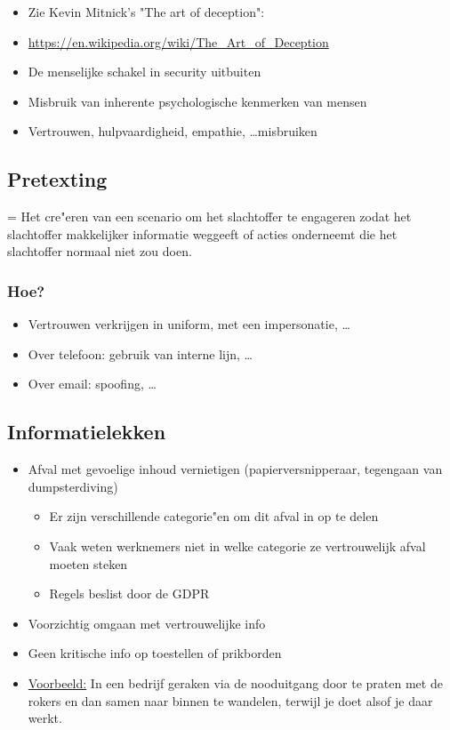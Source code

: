 \documentclass{article}
\begin{document}
\begin{itemize}
    \item Zie Kevin Mitnick's "The art of deception":
    \item \url{https://en.wikipedia.org/wiki/The\_Art\_of\_Deception}
    \item De menselijke schakel in security uitbuiten
    \item Misbruik van inherente psychologische kenmerken van mensen
    \item Vertrouwen, hulpvaardigheid, empathie, \dots misbruiken
\end{itemize}

\subsection{Pretexting}

= Het cre"eren van een scenario om het 
slachtoffer te engageren zodat het slachtoffer 
makkelijker informatie weggeeft of acties onderneemt 
die het slachtoffer normaal niet zou doen.


\subsubsection{Hoe?}

\begin{itemize}
    \item Vertrouwen verkrijgen in uniform, met een impersonatie, \dots
    \item Over telefoon: gebruik van interne lijn, \dots
    \item Over email: spoofing, \dots
\end{itemize}

\subsection{Informatielekken}

\begin{itemize}
    \item Afval met gevoelige inhoud vernietigen (papierversnipperaar, tegengaan van dumpsterdiving)
    \begin{itemize}
        \item Er zijn verschillende categorie"en om dit afval in op te delen
        \item Vaak weten werknemers niet in welke categorie ze vertrouwelijk afval moeten steken
        \item Regels beslist door de GDPR
    \end{itemize}
    \item Voorzichtig omgaan met vertrouwelijke info
    \item Geen kritische info op toestellen of prikborden
    \item \underline{Voorbeeld:} In een bedrijf geraken via de nooduitgang door te praten met de rokers en dan samen naar binnen te wandelen, terwijl je doet alsof je daar werkt.
\end{itemize}
\end{document}
